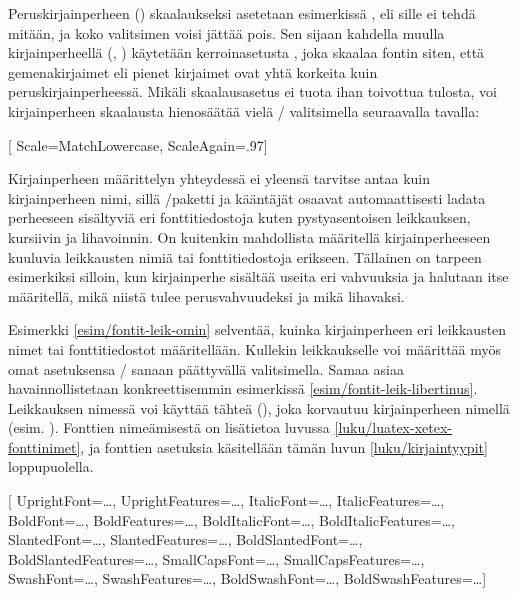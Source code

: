 Peruskirjainperheen () skaalaukseksi asetetaan
esimerkissä , eli sille ei tehdä mitään, ja koko
valitsimen voisi jättää pois. Sen sijaan kahdella muulla
kirjainperheellä (, )
käytetään kerroinasetusta , joka skaalaa fontin
siten, että gemenakirjaimet eli pienet kirjaimet ovat yhtä korkeita kuin
peruskirjainperheessä. Mikäli skaalausasetus  ei
tuota ihan toivottua tulosta, voi kirjainperheen skaalausta hienosäätää
vielä \-/ valitsimella seuraavalla tavalla:

\begin{koodilohkosis}
\setmonofont{TeX Gyre Cursor}[
  Scale=MatchLowercase, ScaleAgain=.97]
\end{koodilohkosis}

\noindent
Kirjainperheen määrittelyn yhteydessä ei yleensä tarvitse antaa kuin
kirjainperheen nimi, sillä \-/paketti ja kääntäjät
osaavat automaattisesti ladata perheeseen sisältyviä eri
fonttitiedostoja kuten pystyasentoisen leikkauksen, kursiivin ja
lihavoinnin. On kuitenkin mahdollista määritellä kirjainperheeseen
kuuluvia leikkausten nimiä tai fonttitiedostoja erikseen. Tällainen on
tarpeen esimerkiksi silloin, kun kirjainperhe sisältää useita eri
vahvuuksia ja halutaan itse määritellä, mikä niistä tulee
perusvahvuudeksi ja mikä lihavaksi.

Esimerkki \ref{esim/fontit-leik-omin} selventää, kuinka kirjainperheen
eri leikkausten nimet tai fonttitiedostot määritellään. Kullekin
leikkaukselle voi määrittää myös omat asetuksensa \-/
sanaan päättyvällä valitsimella. Samaa asiaa havainnollistetaan
konkreettisemmin esimerkissä \ref{esim/fontit-leik-libertinus}.
Leikkauksen nimessä voi käyttää tähteä (\koodi{*}), joka korvautuu
kirjainperheen nimellä (esim. ). Fonttien
nimeämisestä on lisätietoa luvussa \ref{luku/luatex-xetex-fonttinimet},
ja fonttien asetuksia käsitellään tämän luvun \ref{luku/kirjaintyypit}
loppupuolella.

\begin{esimerkki*}
\begin{koodilohko}
\setmainfont{…}[
  UprightFont={…},     UprightFeatures={…},
  ItalicFont={…},      ItalicFeatures={…},
  BoldFont={…},        BoldFeatures={…},
  BoldItalicFont={…},  BoldItalicFeatures={…},
  SlantedFont={…},     SlantedFeatures={…},
  BoldSlantedFont={…}, BoldSlantedFeatures={…},
  SmallCapsFont={…},   SmallCapsFeatures={…},
  SwashFont={…},       SwashFeatures={…},
  BoldSwashFont={…},   BoldSwashFeatures={…}]
\end{koodilohko}
  \caption{Kirjainperheeseen sisältyvien leikkausten nimien ja
    kirjainleikkauskohtaisten ominaisuuksien määrittely}
  \label{esim/fontit-leik-omin}
\end{esimerkki*}

